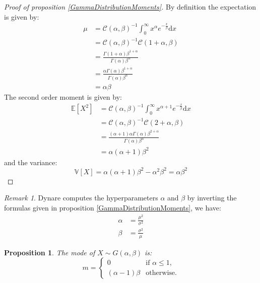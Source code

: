 \documentclass{amsart}
\theoremstyle{plain}
\newtheorem{proposition}{Proposition}[section]
\theoremstyle{remark}
\newtheorem{remark}{Remark}[section]
\numberwithin{equation}{section}
\begin{document}
 \begin{proof}[Proof of proposition \ref{GammaDistributionMoments}]
   By definition the expectation is given by:
   \[
     \begin{split}
       \mu &= \mathcal C(\alpha,\beta)^{-1}\int_{0}^{\infty}x^{\alpha}e^{-\frac{x}{\beta}}\mathrm d x \\
       &= \mathcal C(\alpha,\beta)^{-1}\mathcal C(1+\alpha,\beta) \\
       &= \frac{\Gamma(1+\alpha)\beta^{1+\alpha}}{\Gamma(\alpha)\beta^{\alpha}} \\
       &= \frac{\alpha\Gamma(\alpha)\beta^{1+\alpha}}{\Gamma(\alpha)\beta^{\alpha}} \\
       &= \alpha\beta
     \end{split}
   \]
   The second order moment is given by:
   \[
     \begin{split}
       \mathbb E [X^2] &= \mathcal C(\alpha,\beta)^{-1}\int_{0}^{\infty}x^{\alpha+1}e^{-\frac{x}{\beta}}\mathrm d x \\
       &= \mathcal C(\alpha,\beta)^{-1}\mathcal C(2+\alpha,\beta) \\
       &= \frac{(\alpha+1)\alpha\Gamma(\alpha)\beta^{2+\alpha}}{\Gamma(\alpha)\beta^{\alpha}} \\
       &= \alpha(\alpha+1)\beta^2 
     \end{split}
   \]
   and the variance:
   \[
     \mathbb V[X] = \alpha(\alpha+1)\beta^2 - \alpha^2\beta^2 = \alpha\beta^2
   \]
 \end{proof}
 
 \begin{remark}
   Dynare computes the hyperparameters $\alpha$ and $\beta$ by
   inverting the formulas given in proposition
   \ref{GammaDistributionMoments}, we have:
   \[
     \begin{split}
       \alpha &= \frac{\mu^2}{\sigma^2} \\
       \beta &= \frac{\sigma^2}{\mu}
     \end{split}
   \]
 \end{remark}

 \begin{proposition}
   \label{GammaDistributionMode}
   The mode of $X\sim G(\alpha, \beta)$ is:
   \[
     m = 
     \begin{cases}
       0 &\text{if } \alpha\leq 1\text{,} \\
       (\alpha-1)\beta &\text{otherwise.}
     \end{cases}
   \]
 \end{proposition}
\end{document}
